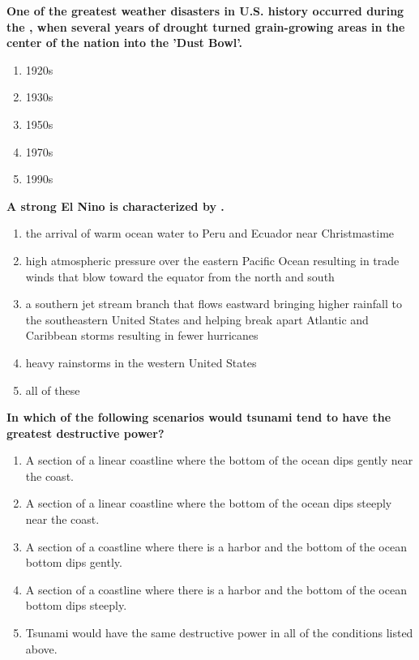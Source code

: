 \item {
\setlength{\itemsep}{0cm}
\setlength{\parskip}{.2cm}
\begin{samepage}
\textbf{
One of the greatest weather disasters in U.S. history occurred during the \makebox[1cm]{\Rivpt\hrulefill\Rivpt}, when several years of drought turned grain-growing areas in the center of the nation into the 'Dust Bowl'. 
}
\begin{enumerate}
\item {  1920s }
\item {  1930s }
\item {  1950s }
\item {  1970s }
\item {  1990s }
\end{enumerate}
\end{samepage}
}
\item {
\setlength{\itemsep}{0cm}
\setlength{\parskip}{.2cm}
\begin{samepage}
\textbf{
A strong El Nino is characterized by \makebox[1cm]{\Rivpt\hrulefill\Rivpt}.
}
\begin{enumerate}
\item {  the arrival of warm ocean water to Peru and Ecuador near Christmastime }
\item {  high atmospheric pressure over the eastern Pacific Ocean resulting in trade winds that blow toward the equator from the north and south }
\item {  a southern jet stream branch that flows eastward bringing higher rainfall to the southeastern United States and helping break apart Atlantic and Caribbean storms resulting in fewer hurricanes }
\item {  heavy rainstorms in the western United States }
\item {  all of these }
\end{enumerate}
\end{samepage}
}
\item {
\setlength{\itemsep}{0cm}
\setlength{\parskip}{.2cm}
\begin{samepage}
\textbf{
In which of the following scenarios would tsunami tend to have the greatest destructive power?
}
\begin{enumerate}
\item { 	A section of a linear coastline where the bottom of the ocean dips gently near the coast. }
\item { 	A section of a linear coastline where the bottom of the ocean dips steeply near the coast. }
\item { 	A section of a coastline where there is a harbor and the bottom of the ocean bottom dips gently. }
\item { 	A section of a coastline where there is a harbor and the bottom of the ocean bottom dips steeply. }
\item { 	Tsunami would have the same destructive power in all of the conditions listed above. }
\end{enumerate}
\end{samepage}
}
